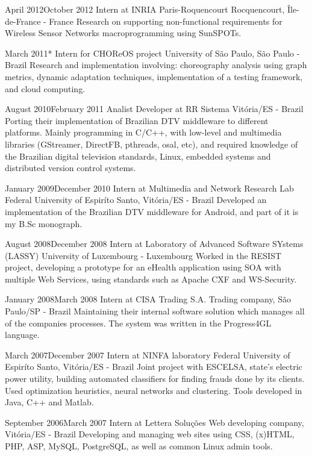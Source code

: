 \documentclass{friggeri-cv}
\begin{document}
\workentry
  {April 2012}{October 2012}
  {Intern at INRIA Paris-Roquencourt}
  {Rocquencourt, Île-de-France - France}
  {Research on supporting non-functional requirements for Wireless Sensor Networks macroprogramming using SunSPOTs.}

\workentry
  {March 2011}{*}
  {Intern for CHOReOS project}
  {University of São Paulo, São Paulo - Brazil}
  {Research and implementation involving: choreography analysis using graph metrics,
  dynamic adaptation techniques, implementation of a testing framework, and cloud computing.}

\workentry
  {August 2010}{February 2011}
  {Analist Developer at RR Sistema}
  {Vitória/ES - Brazil}
  {Porting their implementation of Brazilian DTV middleware to different platforms.
  Mainly programming in C/C++, with low-level and multimedia libraries (GStreamer, DirectFB, pthreads, osal, etc),
  and required knowledge of the Brazilian digital television standards, Linux, embedded systems and
  distributed version control systems.}

\workentry
  {January 2009}{December 2010}
  {Intern at Multimedia and Network Research Lab}
  {Federal University of Espiríto Santo, Vitória/ES - Brazil}
  {Developed an implementation of the Brazilian DTV middleware for Android, and part of it is my B.Sc monograph.}

\workentry
  {August 2008}{December 2008}
  {Intern at Laboratory of Advanced Software SYstems (LASSY)}
  {University of Luxembourg - Luxembourg}
  {Worked in the RESIST project, developing a prototype for an eHealth application using SOA with multiple Web Services,
  using standards such as Apache CXF and WS-Security.}

\workentry
  {January 2008}{March 2008}
  {Intern at CISA Trading S.A.}
  {Trading company, São Paulo/SP - Brazil}
  {Maintaining their internal software solution which manages all of the companies processes.
  The system was written in the Progress4GL language.}

\workentry
  {March 2007}{December 2007}
  {Intern at NINFA laboratory}
  {Federal University of Espiríto Santo, Vitória/ES - Brazil}
  {Joint project with ESCELSA, state's electric power utility, building automated classifiers
  for finding frauds done by its clients. Used optimization heuristics, neural networks and clustering.
  Tools developed in Java, C++ and Matlab.}

\workentry
  {September 2006}{March 2007}
  {Intern at Lettera Soluções}
  {Web developing company, Vitória/ES - Brazil}
  {Developing and managing web sites using CSS, (x)HTML, PHP, ASP, MySQL, PostgreSQL, as well as common Linux admin tools.}


\end{document}
